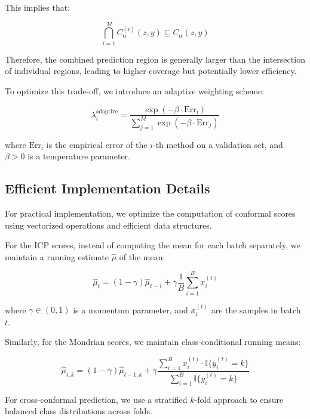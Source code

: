 \documentclass{article}
\theoremstyle{plain}
\theoremstyle{definition}
\theoremstyle{remark}
\begin{document}
This implies that:

\begin{equation}
\bigcap_{i=1}^M C_{\alpha}^{(i)}(z, y) \subseteq C_{\alpha}(z, y)
\end{equation}

Therefore, the combined prediction region is generally larger than the intersection of individual regions, leading to higher coverage but potentially lower efficiency.

To optimize this trade-off, we introduce an adaptive weighting scheme:

\begin{equation}
\lambda_i^{\text{adaptive}} = \frac{\exp(-\beta \cdot \text{Err}_i)}{\sum_{j=1}^M \exp(-\beta \cdot \text{Err}_j)}
\end{equation}

where $\text{Err}_i$ is the empirical error of the $i$-th method on a validation set, and $\beta > 0$ is a temperature parameter.

\subsection{Efficient Implementation Details}

For practical implementation, we optimize the computation of conformal scores using vectorized operations and efficient data structures.

For the ICP scores, instead of computing the mean for each batch separately, we maintain a running estimate $\hat{\mu}$ of the mean:

\begin{equation}
\hat{\mu}_t = (1 - \gamma) \hat{\mu}_{t-1} + \gamma \frac{1}{B} \sum_{i=1}^B x_i^{(t)}
\end{equation}

where $\gamma \in (0, 1)$ is a momentum parameter, and $x_i^{(t)}$ are the samples in batch $t$.

Similarly, for the Mondrian scores, we maintain class-conditional running means:

\begin{equation}
\hat{\mu}_{t,k} = (1 - \gamma) \hat{\mu}_{t-1,k} + \gamma \frac{\sum_{i=1}^B x_i^{(t)} \cdot \mathbb{I}\{y_i^{(t)} = k\}}{\sum_{i=1}^B \mathbb{I}\{y_i^{(t)} = k\}}
\end{equation}

For cross-conformal prediction, we use a stratified $k$-fold approach to ensure balanced class distributions across folds.
\end{document}
